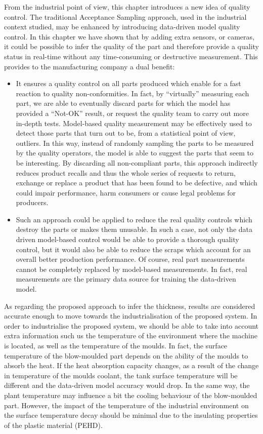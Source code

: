 From the industrial point of view, this chapter introduces a new idea of quality control. The traditional Acceptance Sampling approach, used in the industrial context studied, may be enhanced by introducing data-driven model quality control. In this chapter we have shown that by adding extra sensors, or cameras, it could be possible to infer the quality of the part and therefore provide a quality status in real-time without any time-consuming or destructive measurement. This provides to the manufacturing company a dual benefit:
%
\begin{itemize}
    \item It ensures a quality control on all parts produced which enable for a fast reaction to quality non-conformities. In fact, by ``virtually'' measuring each part, we are able to eventually discard parts for which the model has provided a ``Not-OK'' result, or request the quality team to carry out more in-depth tests. Model-based quality measurement may be effectively used to detect those parts that turn out to be, from a statistical point of view, outliers. In this way, instead of randomly sampling the parts to be measured by the quality operators, the model is able to suggest the parts that seem to be interesting. By discarding all non-compliant parts, this approach indirectly reduces product recalls and thus the whole series of requests to return, exchange or replace a product that has been found to be defective, and which could impair performance, harm consumers or cause legal problems for producers.
    \item Such an approach could be applied to reduce the real quality controls which destroy the parts or makes them unusable. In such a case, not only the data driven model-based control would be able to provide a thorough quality control, but it would also be able to reduce the scraps which account for an overall better production performance. Of course, real part measurements cannot be completely replaced by model-based measurements. In fact, real measurements are the primary data source for training the data-driven model. 
\end{itemize}
%
As regarding the proposed approach to infer the thickness, results are considered accurate enough to move towards the industrialisation of the proposed system. In order to industrialise the proposed system, we should be able to take into account extra information such us the temperature of the environment where the machine is located, as well as the temperature of the moulds. In fact, the surface temperature of the blow-moulded part depends on the ability of the moulds to absorb the heat. If the heat absorption capacity changes, as a result of the change in temperature of the moulds coolant, the tank surface temperature will be different and the data-driven model accuracy would drop. In the same way, the plant temperature may influence a bit the cooling behaviour of the blow-moulded part. However, the impact of the temperature of the industrial environment on the surface temperature decay should be minimal due to the insulating properties of the plastic material (PEHD).  

\cleardoublepage

